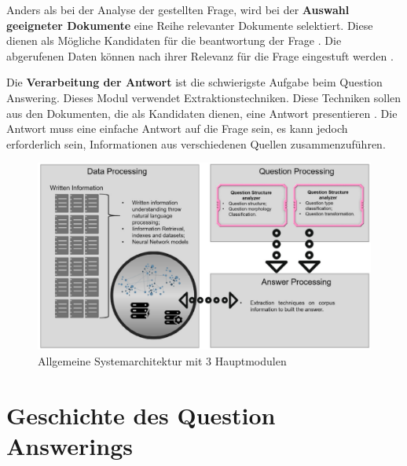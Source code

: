 \documentclass[
        ngerman,
        paper=a4,
        numbers=noendperiod,
]{scrreprt}
\begin{document}
Anders als bei der Analyse der gestellten Frage, wird bei der \textbf{Auswahl geeigneter Dokumente} eine Reihe relevanter Dokumente selektiert. Diese dienen als Mögliche Kandidaten für die beantwortung der Frage \cite{Malik2013DomainSystem}. Die abgerufenen Daten können nach ihrer Relevanz für die Frage eingestuft werden \citep{Neves2015QuestionBiology}. 

Die \textbf{Verarbeitung der Antwort} ist die schwierigste Aufgabe beim Question Answering. Dieses Modul verwendet Extraktionstechniken. Diese Techniken sollen aus den Dokumenten, die als Kandidaten dienen, eine Antwort presentieren \citep{Bhoir2014QuestionApproach}. Die Antwort muss eine einfache Antwort auf die Frage sein, es kann jedoch erforderlich sein, Informationen aus verschiedenen Quellen zusammenzuführen.

\begin{figure}[H]
    \centering\includegraphics[width=1\linewidth]{images/arch.png}
    \caption[Allgemeine Systemarchitektur mit 3 Hauptmodulen]{Allgemeine Systemarchitektur mit 3 Hauptmodulen \cite [S. 3]{CalijorneSoares2018ASystems}}
    \label{fig:architektur}
\end{figure}
\section{Geschichte des Question Answerings}

%
\end{document}
